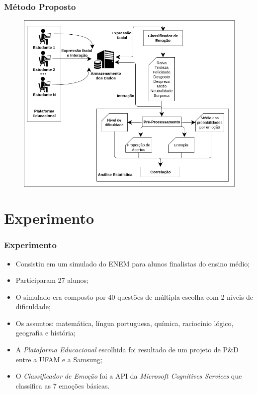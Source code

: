 \documentclass{beamer}
\begin{document}
\begin{frame}
\frametitle{M\'etodo Proposto}
\begin{figure}
\centering
\includegraphics[scale=0.35]{figuras/diagrama.png}
\end{figure}
\end{frame}

\section{Experimento}
\begin{frame}
\frametitle{Experimento}
\begin{itemize}
\pause
\item Consistiu em um simulado do ENEM para alunos finalistas do ensino m\'{e}dio;
\pause
\item Participaram 27 alunos;
\pause
\item O simulado era composto por 40 quest\~{o}es de m\'{u}ltipla escolha com 2 n\'{i}veis de dificuldade;
\pause
\item Os assuntos: matem\'{a}tica, l\'{i}ngua portuguesa, qu\'{i}mica, racioc\'{i}nio l\'{o}gico, geografia e hist\'{o}ria;
\pause
\item A \textit{Plataforma Educacional} escolhida foi resultado de um projeto de P\&D entre a UFAM e a Samsung;
\pause
\item O \textit{Classificador de Emo\c{c}\~ao} foi a API da \textit{Microsoft Cognitives Services} que classifica as 7 emo\c{c}\~oes b\'{a}sicas.
\end{itemize}

\end{frame}
\end{document}
